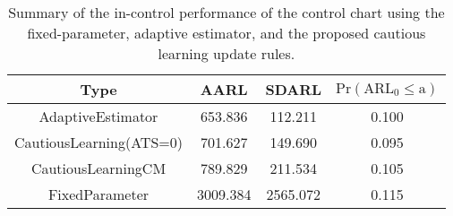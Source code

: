 \begin{table}[!h]

\caption{Summary of the in-control performance of the control chart using the fixed-parameter, adaptive estimator, and the proposed cautious learning update rules.}
\centering
\begin{tabular}[t]{cccc}
\toprule
Type & AARL & SDARL & $\text{Pr}(\text{ARL}_0 \leq \text{a})$\\
\midrule
AdaptiveEstimator & 653.836 & 112.211 & 0.100\\
CautiousLearning(ATS=0) & 701.627 & 149.690 & 0.095\\
CautiousLearningCM & 789.829 & 211.534 & 0.105\\
FixedParameter & 3009.384 & 2565.072 & 0.115\\
\bottomrule
\end{tabular}
\end{table}
